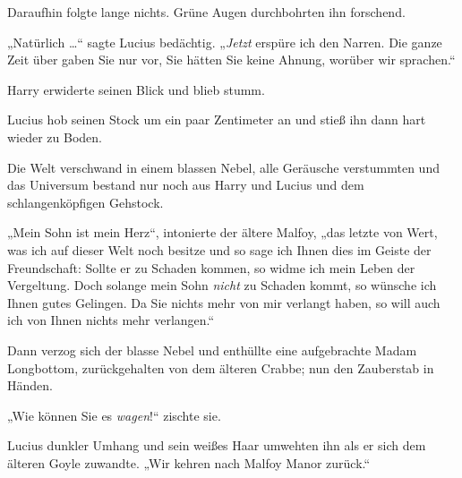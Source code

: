 Daraufhin folgte lange nichts. Grüne Augen durchbohrten ihn forschend.

„Natürlich …“ sagte Lucius bedächtig.
„\emph{Jetzt} erspüre ich den Narren. Die ganze Zeit über gaben Sie nur vor, Sie hätten Sie keine Ahnung, worüber wir sprachen.“

Harry erwiderte seinen Blick und blieb stumm.

Lucius hob seinen Stock um ein paar Zentimeter an und stieß ihn dann hart wieder zu Boden.

Die Welt verschwand in einem blassen Nebel, alle Geräusche verstummten und das Universum bestand nur noch aus Harry und Lucius und dem schlangenköpfigen Gehstock.

„Mein Sohn ist mein Herz“, intonierte der ältere Malfoy, „das letzte von Wert, was ich auf dieser Welt noch besitze und so sage ich Ihnen dies im Geiste der Freundschaft: Sollte er zu Schaden kommen, so widme ich mein Leben der Vergeltung. Doch solange mein Sohn \emph{nicht} zu Schaden kommt, so wünsche ich Ihnen gutes Gelingen. Da Sie nichts mehr von mir verlangt haben, so will auch ich von Ihnen nichts mehr verlangen.“

Dann verzog sich der blasse Nebel und enthüllte eine aufgebrachte Madam Longbottom, zurückgehalten von dem älteren Crabbe; nun den Zauberstab in Händen.

„Wie können Sie es \emph{wagen}!“ zischte sie.

Lucius dunkler Umhang und sein weißes Haar umwehten ihn als er sich dem älteren Goyle zuwandte.
„Wir kehren nach Malfoy Manor zurück.“


